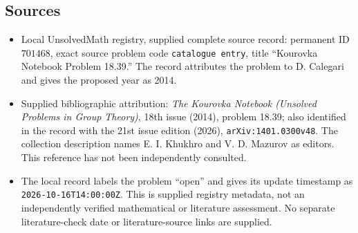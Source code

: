 \documentclass[11pt]{article}
\begin{document}
\subsection{Sources}
\begin{itemize}
\item Local UnsolvedMath registry, supplied complete source record: permanent ID \(701468\), exact source problem code \texttt{catalogue entry}, title ``Kourovka Notebook Problem 18.39.'' The record attributes the problem to D. Calegari and gives the proposed year as 2014.
\item Supplied bibliographic attribution: \emph{The Kourovka Notebook (Unsolved Problems in Group Theory)}, 18th issue (2014), problem 18.39; also identified in the record with the 21st issue edition (2026), \texttt{arXiv:1401.0300v48}. The collection description names E. I. Khukhro and V. D. Mazurov as editors. This reference has not been independently consulted.
\item The local record labels the problem ``open'' and gives its update timestamp as \texttt{2026-10-16T14:00:00Z}. This is supplied registry metadata, not an independently verified mathematical or literature assessment. No separate literature-check date or literature-source links are supplied.
\end{itemize}
\end{document}
